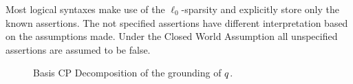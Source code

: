Most logical syntaxes make use of the $\ell_0$-sparsity and explicitly store only the known assertions.
The not specified assertions have different interpretation based on the assumptions made.
Under the Closed World Assumption all unspecified assertions are assumed to be false.

\begin{figure}[h]
\begin{center}
	
\end{center}
\caption{Basis CP Decomposition of the grounding of $q$.}
	\label{fig:groundingCP}
\end{figure}





%
%
%
%
%



